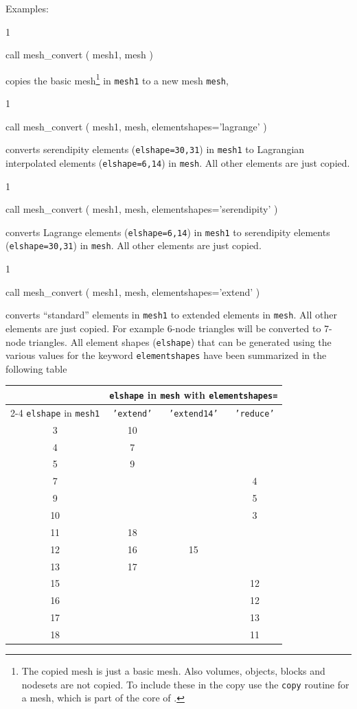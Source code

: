 Examples:
\begin{listing}{1}

  call mesh_convert ( mesh1, mesh ) 

\end{listing}
copies the basic mesh\footnote{The copied mesh is just a basic mesh. Also
volumes, objects, blocks and nodesets are not copied. To include these in the
copy use the \texttt{copy} routine for a mesh,
which is part of the core of \tfem.}
in \texttt{mesh1} to a new mesh \texttt{mesh},
\begin{listing}{1}

  call mesh_convert ( mesh1, mesh, elementshapes='lagrange' ) 

\end{listing}
converts serendipity elements (\texttt{elshape=30,31})
in \texttt{mesh1} to Lagrangian
interpolated elements (\texttt{elshape=6,14})
in \texttt{mesh}. All other elements are just copied.
\begin{listing}{1}

  call mesh_convert ( mesh1, mesh, elementshapes='serendipity' ) 

\end{listing}
converts Lagrange elements (\texttt{elshape=6,14}) in \texttt{mesh1} to
serendipity elements (\texttt{elshape=30,31}) in \texttt{mesh}.
All other elements are just copied.
\begin{listing}{1}

  call mesh_convert ( mesh1, mesh, elementshapes='extend' ) 

\end{listing}
converts ``standard'' elements in \texttt{mesh1} to
extended elements in \texttt{mesh}. 
All other elements are just copied.
For example 6-node triangles will be converted to 7-node triangles.
All element shapes (\texttt{elshape}) that can be generated
using the various values for the keyword \texttt{elementshapes}
have been summarized in the following table
\begin{center}
\begin{tabular}{c|ccc}
 & \multicolumn{3}{c}{\texttt{elshape} in \texttt{mesh} with
\texttt{elementshapes=}}\\\cline{2-4}
\texttt{elshape} in \texttt{mesh1} &
 \texttt{'extend'} & \texttt{'extend14'} & \texttt{'reduce'} \\\hline
3 & 10 & & \\
4 &  7 & & \\
5 &  9 & & \\
7 & & & 4 \\
9 & & & 5 \\
10 & & & 3 \\
11 & 18 & & \\
12 & 16 & 15  & \\
13 & 17 & & \\
15 & & & 12 \\
16 & & & 12 \\
17 & & & 13 \\
18 & & & 11
\end{tabular}
\end{center}

